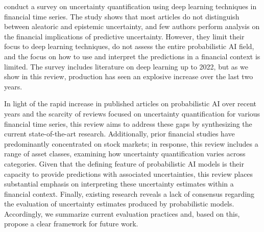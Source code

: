 \textcite{Blasco_et_al_2024} conduct a survey on uncertainty quantification using deep learning techniques in financial time series. The study shows that most articles do not distinguish between aleatoric and epistemic uncertainty, and few authors perform analysis on the financial implications of predictive uncertainty. However, they limit their focus to deep learning techniques, do not assess the entire probabilistic AI field, and the focus on how to use and interpret the predictions in a financial context is limited. The survey includes literature on deep learning up to 2022, but as we show in this review, production has seen an explosive increase over the last two years. 

In light of the rapid increase in published articles on probabilistic AI over recent years and the scarcity of reviews focused on uncertainty quantification for various financial time series, this review aims to address these gaps by synthesizing the current state-of-the-art research. Additionally, prior financial studies have predominantly concentrated on stock markets; in response, this review includes a range of asset classes, examining how uncertainty quantification varies across categories. Given that the defining feature of probabilistic AI models is their capacity to provide predictions with associated uncertainties, this review places substantial emphasis on interpreting these uncertainty estimates within a financial context. Finally, existing research reveals a lack of consensus regarding the evaluation of uncertainty estimates produced by probabilistic models. Accordingly, we summarize current evaluation practices and, based on this, propose a clear framework for future work. 





